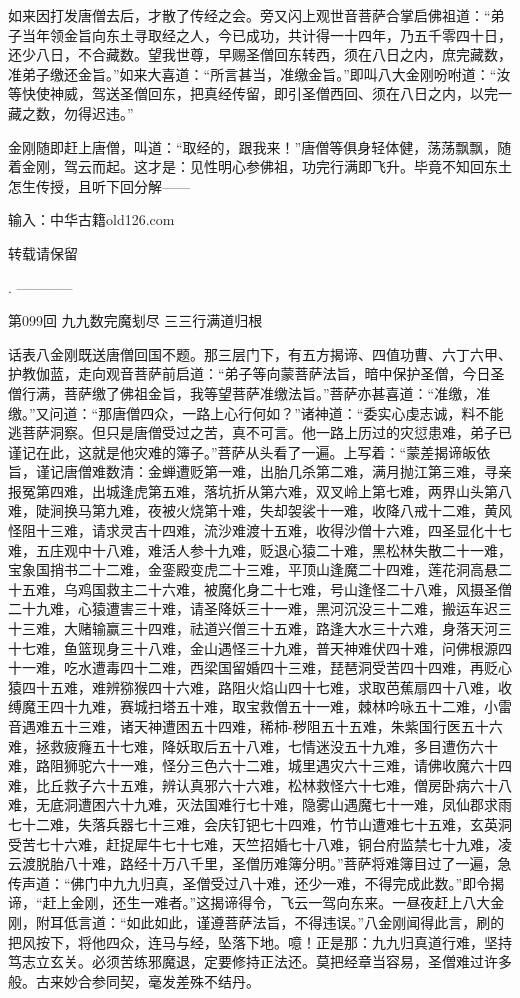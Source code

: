 \documentclass[12pt,UTF8]{ctexbook}
\begin{document}
{	如来因打发唐僧去后，才散了传经之会。旁又闪上观世音菩萨合掌启佛祖道：“弟子当年领金旨向东土寻取经之人，今已成功，共计得一十四年，乃五千零四十日，还少八日，不合藏数。望我世尊，早赐圣僧回东转西，须在八日之内，庶完藏数，准弟子缴还金旨。”如来大喜道：“所言甚当，准缴金旨。”即叫八大金刚吩咐道：“汝等快使神威，驾送圣僧回东，把真经传留，即引圣僧西回、须在八日之内，以完一藏之数，勿得迟违。”
	
	金刚随即赶上唐僧，叫道：“取经的，跟我来！”唐僧等俱身轻体健，荡荡飘飘，随着金刚，驾云而起。这才是：见性明心参佛祖，功完行满即飞升。毕竟不知回东土怎生传授，且听下回分解——
	
	输入：中华古籍old126.com
	
	转载请保留
	
	.
	------------
	
	第099回 九九数完魔刬尽   三三行满道归根
	
	话表八金刚既送唐僧回国不题。那三层门下，有五方揭谛、四值功曹、六丁六甲、护教伽蓝，走向观音菩萨前启道：“弟子等向蒙菩萨法旨，暗中保护圣僧，今日圣僧行满，菩萨缴了佛祖金旨，我等望菩萨准缴法旨。”菩萨亦甚喜道：“准缴，准缴。”又问道：“那唐僧四众，一路上心行何如？”诸神道：“委实心虔志诚，料不能逃菩萨洞察。但只是唐僧受过之苦，真不可言。他一路上历过的灾愆患难，弟子已谨记在此，这就是他灾难的簿子。”菩萨从头看了一遍。上写着：“蒙差揭谛皈依旨，谨记唐僧难数清：金蝉遭贬第一难，出胎几杀第二难，满月抛江第三难，寻亲报冤第四难，出城逢虎第五难，落坑折从第六难，双叉岭上第七难，两界山头第八难，陡涧换马第九难，夜被火烧第十难，失却袈裟十一难，收降八戒十二难，黄风怪阻十三难，请求灵吉十四难，流沙难渡十五难，收得沙僧十六难，四圣显化十七难，五庄观中十八难，难活人参十九难，贬退心猿二十难，黑松林失散二十一难，宝象国捎书二十二难，金銮殿变虎二十三难，平顶山逢魔二十四难，莲花洞高悬二十五难，乌鸡国救主二十六难，被魔化身二十七难，号山逢怪二十八难，风摄圣僧二十九难，心猿遭害三十难，请圣降妖三十一难，黑河沉没三十二难，搬运车迟三十三难，大赌输赢三十四难，祛道兴僧三十五难，路逢大水三十六难，身落天河三十七难，鱼篮现身三十八难，金山遇怪三十九难，普天神难伏四十难，问佛根源四十一难，吃水遭毒四十二难，西梁国留婚四十三难，琵琶洞受苦四十四难，再贬心猿四十五难，难辨猕猴四十六难，路阻火焰山四十七难，求取芭蕉扇四十八难，收缚魔王四十九难，赛城扫塔五十难，取宝救僧五十一难，棘林吟咏五十二难，小雷音遇难五十三难，诸天神遭困五十四难，稀柿-秽阻五十五难，朱紫国行医五十六难，拯救疲癃五十七难，降妖取后五十八难，七情迷没五十九难，多目遭伤六十难，路阻狮驼六十一难，怪分三色六十二难，城里遇灾六十三难，请佛收魔六十四难，比丘救子六十五难，辨认真邪六十六难，松林救怪六十七难，僧房卧病六十八难，无底洞遭困六十九难，灭法国难行七十难，隐雾山遇魔七十一难，凤仙郡求雨七十二难，失落兵器七十三难，会庆钉钯七十四难，竹节山遭难七十五难，玄英洞受苦七十六难，赶捉犀牛七十七难，天竺招婚七十八难，铜台府监禁七十九难，凌云渡脱胎八十难，路经十万八千里，圣僧历难簿分明。”菩萨将难簿目过了一遍，急传声道：“佛门中九九归真，圣僧受过八十难，还少一难，不得完成此数。”即令揭谛，“赶上金刚，还生一难者。”这揭谛得令，飞云一驾向东来。一昼夜赶上八大金刚，附耳低言道：“如此如此，谨遵菩萨法旨，不得违误。”八金刚闻得此言，刷的把风按下，将他四众，连马与经，坠落下地。噫！正是那：九九归真道行难，坚持笃志立玄关。必须苦练邪魔退，定要修持正法还。莫把经章当容易，圣僧难过许多般。古来妙合参同契，毫发差殊不结丹。
	
}
\end{document}
